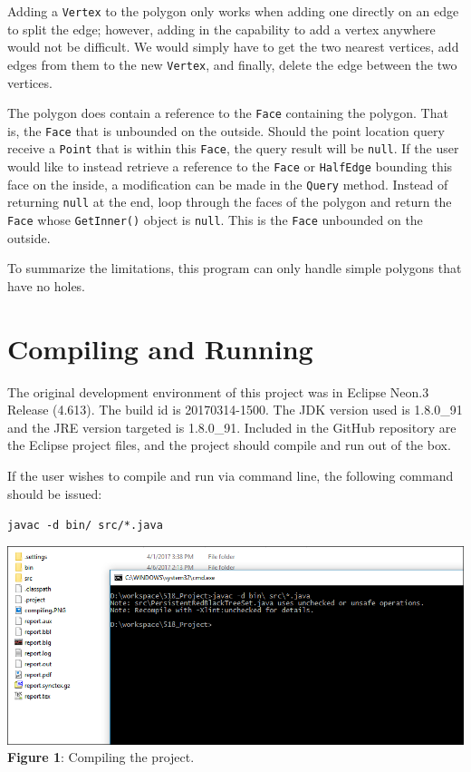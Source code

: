 \documentclass[11pt]{article}
\begin{document}
	Adding a \texttt{Vertex} to the polygon only works when adding one directly on an edge to split the edge; however, adding in the capability to add a vertex anywhere would not be difficult. We would simply have to get the two nearest vertices, add edges from them to the new \texttt{Vertex}, and finally, delete the edge between the two vertices.
	
	The polygon does contain a reference to the \texttt{Face} containing the polygon. That is, the \texttt{Face} that is unbounded on the outside. Should the point location query receive a \texttt{Point} that is within this \texttt{Face}, the query result will be \texttt{null}. If the user would like to instead retrieve a reference to the \texttt{Face} or \texttt{HalfEdge} bounding this face on the inside, a modification can be made in the \texttt{Query} method. Instead of returning \texttt{null} at the end, loop through the faces of the polygon and return the \texttt{Face} whose \texttt{GetInner()} object is \texttt{null}. This is the \texttt{Face} unbounded on the outside.
	
	To summarize the limitations, this program can only handle simple polygons that have no holes.
	
\section{Compiling and Running}
\label{compile}

	The original development environment of this project was in Eclipse Neon.3 Release (4.613). The build id is 20170314-1500. The JDK version used is 1.8.0\_91 and the JRE version targeted is 1.8.0\_91. Included in the GitHub repository are the Eclipse project files, and the project should compile and run out of the box.
	
	If the user wishes to compile and run via command line, the following command should be issued:
	
	\begin{center}
		\texttt{javac -d bin/ src/*.java}
	\end{center}
	
	\begin{center}
		\includegraphics[scale=0.5]{compiling} \\
		\textbf{Figure 1}: Compiling the project.
	\end{center}
	
\end{document}
